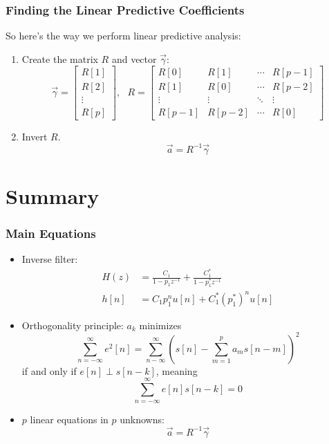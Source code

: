 \documentclass{beamer}
\begin{document}
\begin{frame}
  \frametitle{Finding the Linear Predictive Coefficients}
  
  So here's the way we perform linear predictive analysis:
  \begin{enumerate}
  \item Create the matrix $R$ and vector $\vec\gamma$:
    \begin{displaymath}
      \vec\gamma = \left[\begin{array}{c}R[1]\\ R[2]\\\vdots\\ R[p]\end{array}\right],~~~
      R = \left[\begin{array}{cccc} R[0] & R[1] &  \cdots & R[p-1] \\
          R[1] & R[0] & \cdots & R[p-2] \\
          \vdots & \vdots & \ddots & \vdots \\
          R[p-1] & R[p-2] & \cdots & R[0] \end{array}\right]
    \end{displaymath}
  \item Invert $R$.
    \begin{displaymath}
      \vec{a} = R^{-1} \vec\gamma
    \end{displaymath}
  \end{enumerate}
\end{frame}

%


\section[Summary]{Summary}
\setcounter{subsection}{1}

\begin{frame}
  \frametitle{Main Equations}
  \begin{itemize}
  \item Inverse filter:
    \begin{align*}
      H(z) &= \frac{C_1}{1-p_1z^{-1}}+\frac{C_1^*}{1-p_1^* z^{-1}}\\
      h[n] &= C_1p_1^n u[n] + C_1^* (p_1^*)^n u[n]
    \end{align*}
  \item Orthogonality principle: $a_k$ minimizes
    \[
    \sum_{n=-\infty}^\infty e^2[n] = \sum_{n-\infty}^\infty \left(s[n]-\sum_{m=1}^p a_m s[n-m]\right)^2
    \]
    if and only if $e[n]\perp s[n-k]$, meaning
    \[
    \sum_{n=-\infty}^{\infty}e[n]s[n-k] = 0
    \]
  \item $p$ linear equations  in $p$ unknowns:
    \begin{displaymath}
      \vec{a} = R^{-1} \vec\gamma
    \end{displaymath}
  \end{itemize}
\end{frame}
\end{document}
